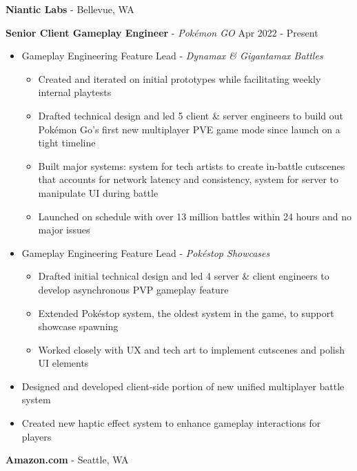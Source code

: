 \documentclass[resmargin,10pt]{res} %
\begin{document}
\begin{resume}
     {\bf Niantic Labs} - Bellevue, WA \\
    \begin{ncolumn}{1}
        {\bf Senior Client Gameplay Engineer} - \textit{Pokémon GO} \hfill Apr 2022 - Present
    \end{ncolumn}
    \begin{itemize}
        \setlength\itemsep{-0.0em}
        \item Gameplay Engineering Feature Lead - \textit{Dynamax \& Gigantamax Battles}
        \begin{itemize}[leftmargin=0.5em,topsep=0.0em]
            \setlength\itemsep{-0.0em}
            \item Created and iterated on initial prototypes while facilitating weekly internal playtests
            \item Drafted technical design and led 5 client \& server engineers to build out Pokémon Go's first new multiplayer PVE game mode since launch on a tight timeline
            \item Built major systems: system for tech artists to create in-battle cutscenes that accounts for network latency and consistency, system for server to manipulate UI during battle
            \item Launched on schedule with over 13 million battles within 24 hours and no major issues
        \end{itemize}
        \item Gameplay Engineering Feature Lead - \textit{Pokéstop Showcases}
        \begin{itemize}[leftmargin=0.5em,topsep=0.0em]
            \setlength\itemsep{-0.0em}
            \item Drafted initial technical design and led 4 server \& client engineers to develop asynchronous PVP gameplay feature
            \item Extended Pokéstop system, the oldest system in the game, to support showcase spawning
            \item Worked closely with UX and tech art to implement cutscenes and polish UI elements
        \end{itemize}
        \item Designed and developed client-side portion of new unified multiplayer battle system
        \item Created new haptic effect system to enhance gameplay interactions for players
    \end{itemize}
    {\bf Amazon.com} - Seattle, WA \\

\end{resume}
\end{document}
